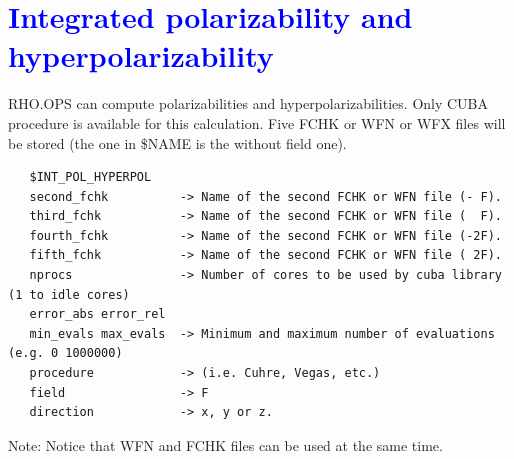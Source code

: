 \documentclass[10pt,a4paper]{article}
\newcommand{\tbl}[1]{{\textcolor{blue}{#1}}}
\begin{document}
{\section{\tbl{\textbf{Integrated polarizability and hyperpolarizability}}}
\noindent RHO.OPS can compute polarizabilities and hyperpolarizabilities. Only CUBA procedure is available for this calculation. Five FCHK or WFN or WFX files will be stored (the one in \$NAME is the without field one). 
\begin{verbatim}
   $INT_POL_HYPERPOL
   second_fchk          -> Name of the second FCHK or WFN file (- F). 
   third_fchk           -> Name of the second FCHK or WFN file (  F). 
   fourth_fchk          -> Name of the second FCHK or WFN file (-2F). 
   fifth_fchk           -> Name of the second FCHK or WFN file ( 2F). 
   nprocs               -> Number of cores to be used by cuba library (1 to idle cores) 
   error_abs error_rel    
   min_evals max_evals  -> Minimum and maximum number of evaluations (e.g. 0 1000000)
   procedure            -> (i.e. Cuhre, Vegas, etc.)
   field                -> F
   direction            -> x, y or z.  
\end{verbatim}
Note: Notice that WFN and FCHK files can be used at the same time.\\
}
\end{document}
